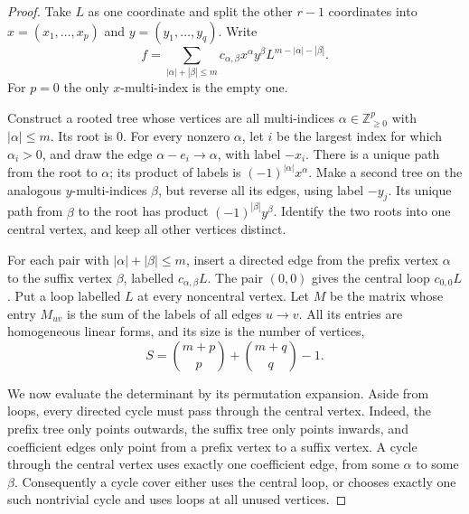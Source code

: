 \begin{proof}
Take \(L\) as one coordinate and split the other \(r-1\) coordinates
into \(x=(x_1,\ldots,x_p)\) and \(y=(y_1,\ldots,y_q)\). Write
\begin{equation}\label{eq:M007expansion}
 f=\sum_{|\alpha|+|\beta|\leq m}
       c_{\alpha,\beta}x^\alpha y^\beta
                      L^{m-|\alpha|-|\beta|}.
\end{equation}
For \(p=0\) the only \(x\)-multi-index is the empty one.

Construct a rooted tree whose vertices are all multi-indices
\(\alpha\in\mathbb Z_{\geq0}^{p}\) with \(|\alpha|\leq m\).
Its root is \(0\). For every nonzero \(\alpha\), let \(i\) be
the largest index for which \(\alpha_i>0\), and draw the edge
\(\alpha-e_i\longrightarrow\alpha\), with label \(-x_i\).
There is a unique path from the root to \(\alpha\); its product
of labels is \((-1)^{|\alpha|}x^\alpha\).
Make a second tree on the analogous \(y\)-multi-indices
\(\beta\), but reverse all its edges, using label \(-y_j\).
Its unique path from \(\beta\) to the root has product
\((-1)^{|\beta|}y^\beta\).
Identify the two roots into one central vertex, and keep all
other vertices distinct.

For each pair with \(|\alpha|+|\beta|\leq m\), insert a directed
edge from the prefix vertex \(\alpha\) to the suffix vertex
\(\beta\), labelled \(c_{\alpha,\beta}L\).
The pair \((0,0)\) gives the central loop
\(c_{0,0}L\). Put a loop labelled \(L\) at every noncentral
vertex. Let \(M\) be the matrix whose entry \(M_{uv}\) is the
sum of the labels of all edges \(u\to v\).
All its entries are homogeneous linear forms, and its size is
the number of vertices,
\[
                    S=\binom{m+p}{p}+\binom{m+q}{q}-1.
\]

We now evaluate the determinant by its permutation expansion.
Aside from loops, every directed cycle must pass through the
central vertex. Indeed, the prefix tree only points outwards,
the suffix tree only points inwards, and coefficient edges
only point from a prefix vertex to a suffix vertex.
A cycle through the central vertex uses exactly one coefficient
edge, from some \(\alpha\) to some \(\beta\).
Consequently a cycle cover either uses the central loop, or
chooses exactly one such nontrivial cycle and uses loops at
all unused vertices.


\end{proof}

